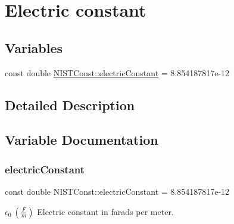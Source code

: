 \hypertarget{group___n_i_s_t_const-_electric_constant}{}\section{Electric constant}
\label{group___n_i_s_t_const-_electric_constant}
\subsection*{Variables}
\begin{DoxyCompactItemize}
\item 
const double \mbox{\hyperlink{group___n_i_s_t_const-_electric_constant_gae5a425228125285727dd53333725ef76}{N\+I\+S\+T\+Const\+::electric\+Constant}} = 8.\+854187817e-\/12
\end{DoxyCompactItemize}


\subsection{Detailed Description}


\subsection{Variable Documentation}
\mbox{\label{group___n_i_s_t_const-_electric_constant_gae5a425228125285727dd53333725ef76}} 
\subsubsection{\texorpdfstring{electric\+Constant}{electricConstant}}
{\footnotesize\ttfamily const double N\+I\+S\+T\+Const\+::electric\+Constant = 8.\+854187817e-\/12}

$\epsilon_0 \ (\frac{F}{m})$ Electric constant in farads per meter. 